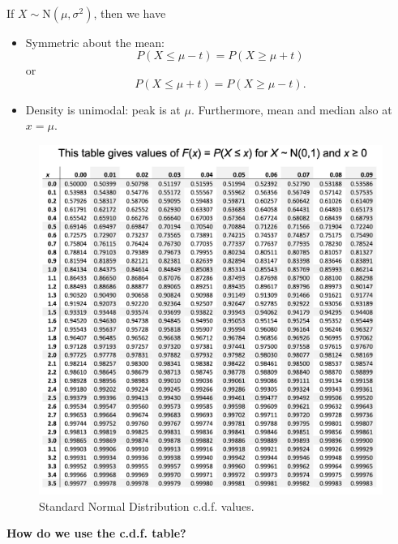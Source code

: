 \begin{theorem}
    \phantom{}\\
    If $X \sim \text{N}(\mu,\sigma^2)$, then we have
    \begin{itemize}
        \item Symmetric about the mean: \vspace{-3mm}
        \[
            P(X \leq \mu - t) = P(X \geq \mu + t)
        \]
        or
        \[
            P(X \leq \mu + t) = P(X \geq \mu - t).
        \]
        \item Density is unimodal: peak is at $\mu$. Furthermore, mean and median also at $x = \mu$.
    \end{itemize}
\end{theorem}

\begin{figure}[htbp]
    \center
    \includegraphics[scale=0.55]{img/N-CDF-table.png}
    \caption{Standard Normal Distribution c.d.f. values.}
\end{figure}

\textbf{How do we use the c.d.f. table?}

